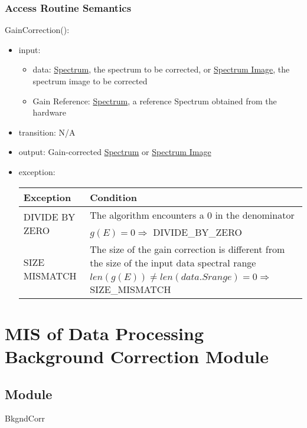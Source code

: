 \documentclass[12pt, titlepage]{article}
\begin{document}
\subsubsection{Access Routine Semantics}
\noindent GainCorrection():
\begin{itemize}
    \item input: 
    \begin{itemize}
        \item data: \hyperref[Mod:Spectrum]{Spectrum}, the spectrum to be corrected, or \hyperref[Mod:SI]{Spectrum Image}, the spectrum image to be corrected
        \item Gain Reference: \hyperref[Mod:Spectrum]{Spectrum}, a reference Spectrum obtained from the hardware
    \end{itemize}
    \item transition: N/A
    \item output: Gain-corrected \hyperref[Mod:Spectrum]{Spectrum} or \hyperref[Mod:SI]{Spectrum Image}
    \item exception:
    \begin{center}
        \begin{tabular}{p{3.5cm} p{12cm}}
            \toprule[0.15em]
            \textbf{Exception} & \textbf{Condition}\\
            \midrule[0.1em]
            \multirow{2}{0.25\textwidth}{DIVIDE BY ZERO} & The algorithm encounters a 0 in the denominator\\ 
            & $g(E) = 0 \Rightarrow$ DIVIDE\_BY\_ZERO\\ 
            \midrule[0.05em]
            \multirow{2}{0.25\textwidth}{SIZE MISMATCH} & The size of the gain correction is different from the size of the input data spectral range\\ 
            & $len(g(E)) \neq len(data.Srange) = 0 \Rightarrow$ SIZE\_MISMATCH\\ 
            \bottomrule[0.15em]
        \end{tabular}
    \end{center}
\end{itemize}


\section{MIS of Data Processing Background Correction Module} \label{Mod:BackgroundCorr}

\subsection{Module}
BkgndCorr
\end{document}
